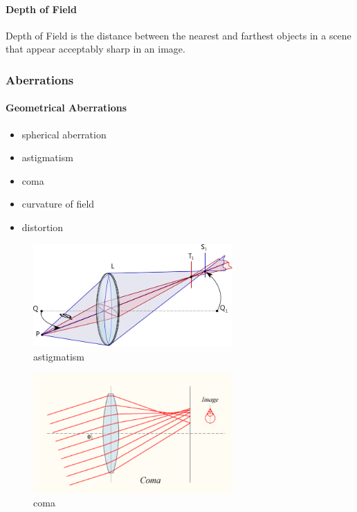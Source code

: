 \paragraph{Depth of Field} Depth of Field is the distance between the nearest and farthest objects in a scene that appear acceptably sharp in an image.


\subsubsection{Aberrations}
\paragraph{Geometrical Aberrations}
\begin{itemize}
\item spherical aberration
\item astigmatism
\item coma
\item curvature of field
\item distortion
\end{itemize}

\begin{figure}
  \centering
  \includegraphics[width=3.0in]{fig/731px-Astigmatism.svg.png}
  \caption{astigmatism}\label{fig_astigmatism}
\end{figure}

\begin{figure}
  \centering
  \includegraphics[width=3.0in]{fig/400px-Lens-coma.png}
  \caption{coma}\label{fig_coma}
\end{figure}


